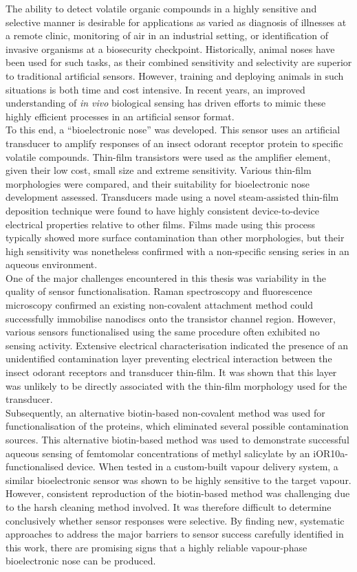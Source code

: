 \documentclass[
  a4paper,
]{scrbook}
\begin{document}
The ability to detect volatile organic compounds in a highly sensitive and selective manner is desirable for applications as varied as diagnosis of illnesses at a remote clinic, monitoring of air in an industrial setting, or identification of invasive organisms at a biosecurity checkpoint. Historically, animal noses have been used for such tasks, as their combined sensitivity and selectivity are superior to traditional artificial sensors. However, training and deploying animals in such situations is both time and cost intensive. In recent years, an improved understanding of \textit{in vivo} biological sensing has driven efforts to mimic these highly efficient processes in an artificial sensor format. \\[5pt] To this end, a “bioelectronic nose” was developed. This sensor uses an artificial transducer to amplify responses of an insect odorant receptor protein to specific volatile compounds. Thin-film transistors were used as the amplifier element, given their low cost, small size and extreme sensitivity. Various thin-film morphologies were compared, and their suitability for bioelectronic nose development assessed. Transducers made using a novel steam-assisted thin-film deposition technique were found to have highly consistent device-to-device electrical properties relative to other films. Films made using this process typically showed more surface contamination than other morphologies, but their high sensitivity was nonetheless confirmed with a non-specific sensing series in an aqueous environment. \\[5pt] One of the major challenges encountered in this thesis was variability in the quality of sensor functionalisation. Raman spectroscopy and fluorescence microscopy confirmed an existing non-covalent attachment method could successfully immobilise nanodiscs onto the transistor channel region. However, various sensors functionalised using the same procedure often exhibited no sensing activity. Extensive electrical characterisation indicated the presence of an unidentified contamination layer preventing electrical interaction between the insect odorant receptors and transducer thin-film. It was shown that this layer was unlikely to be directly associated with the thin-film morphology used for the transducer. \\[5pt] Subsequently, an alternative biotin-based non-covalent method was used for functionalisation of the proteins, which eliminated several possible contamination sources. This alternative biotin-based method was used to demonstrate successful aqueous sensing of femtomolar concentrations of methyl salicylate by an iOR10a-functionalised device. When tested in a custom-built vapour delivery system, a similar bioelectronic sensor was shown to be highly sensitive to the target vapour. However, consistent reproduction of the biotin-based method was challenging due to the harsh cleaning method involved. It was therefore difficult to determine conclusively whether sensor responses were selective. By finding new, systematic approaches to address the major barriers to sensor success carefully identified in this work, there are promising signs that a highly reliable vapour-phase bioelectronic nose can be produced.
\end{document}
